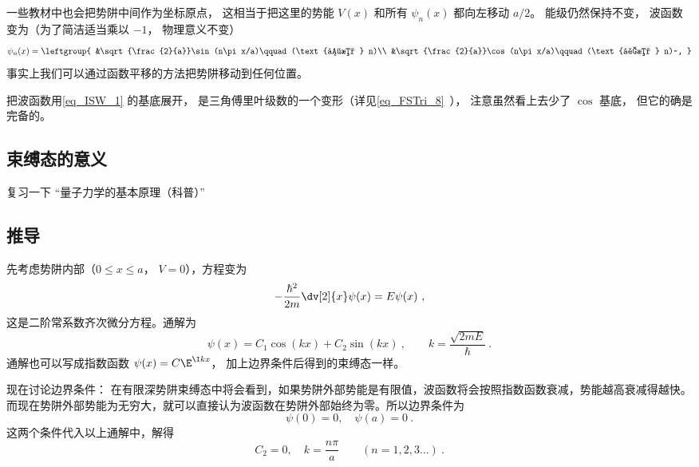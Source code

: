 一些教材中也会把势阱中间作为坐标原点， 这相当于把这里的势能 $V(x)$ 和所有 $\psi_n(x)$ 都向左移动 $a/2$。 能级仍然保持不变， 波函数变为（为了简洁适当乘以 $-1$， 物理意义不变）
\begin{equation}
\psi_n(x) = \leftgroup{
    &\sqrt{\frac{2}{a}}\sin(n\pi x/a)\qquad (\text{偶数 } n)\\
    &\sqrt{\frac{2}{a}}\cos(n\pi x/a)\qquad (\text{奇数 } n)~,
}\end{equation}
事实上我们可以通过函数平移的方法把势阱移动到任何位置。

把波函数用\autoref{eq_ISW_1} 的基底展开， 是三角傅里叶级数的一个变形（详见\autoref{eq_FSTri_8}~）， 注意虽然看上去少了 $\cos$ 基底， 但它的确是完备的。

\subsection{束缚态的意义}
复习一下 “量子力学的基本原理（科普）”

\subsection{推导} 
先考虑势阱内部（$0 \leqslant x \leqslant a$， $V = 0$），方程变为
\begin{equation}
-\frac{\hbar^2}{2m} \dv[2]{x} \psi(x) = E\psi(x) ~,
\end{equation}
这是二阶常系数齐次微分方程。通解为
\begin{equation}
\psi(x) = C_1\cos(kx) + C_2 \sin(kx)~, \qquad
k = \frac{\sqrt{2mE}}{\hbar}~.
\end{equation} 
通解也可以写成指数函数 $\psi(x) = C\E^{\I kx}$， 加上边界条件后得到的束缚态一样。

现在讨论边界条件： 在有限深势阱束缚态中将会看到，如果势阱外部势能是有限值，波函数将会按照指数函数衰减，势能越高衰减得越快。而现在势阱外部势能为无穷大，就可以直接认为波函数在势阱外部始终为零。所以边界条件为
\begin{equation}
\psi(0) = 0, \quad \psi(a) = 0~.
\end{equation}
这两个条件代入以上通解中，解得
\begin{equation}
C_2 = 0, \quad k = \frac{n\pi}{a}  \qquad (n = 1,2,3\dots)~.
\end{equation}

